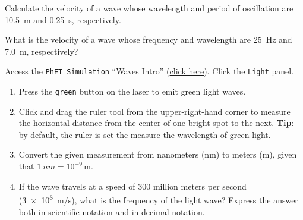 \documentclass[../main-physics-problems.tex]{subfiles}
\begin{document}
\begin{questions}
\question \label{exdA2j}
Calculate the velocity of a wave whose wavelength and period of oscillation are \SI{10.5}{m} and \SI{0.25}{s}, respectively. 


\question \label{HoRqxe}
What is the velocity of a wave whose frequency and wavelength are \SI{25}{Hz} and \SI{7.0}{m}, respectively?


\question
Access the \texttt{PhET Simulation} ``Waves Intro'' (\href{https://phet.colorado.edu/sims/html/waves-intro/latest/waves-intro_en.html}{click here}). Click the \texttt{Light} panel. 

\begin{enumerate}
\setlength\itemsep{0.1ex}
    \item Press the \texttt{green} button on the laser to emit green light waves.
    \item Click and drag the ruler tool from the upper-right-hand corner to measure the horizontal distance from the center of one bright spot to the next. \textbf{Tip}: by default, the ruler is set the measure the wavelength of green light.
    \item Convert the given measurement from nanometers (nm) to meters (m), given that $\SI{1}{nm} = 10^{-9}\,\text{m}$.
    \item If the wave travels at a speed of 300 million meters per second (\SI{3e8}{m/s}), what is the frequency of the light wave? Express the answer both in scientific notation and in decimal notation.
\end{enumerate}




\end{questions}
\end{document}

